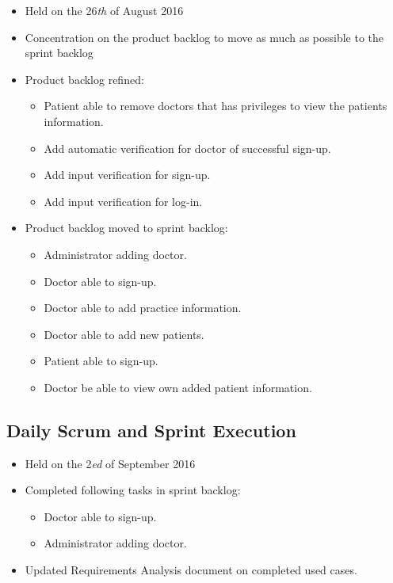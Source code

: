 \documentclass[a4paper]{article}
\begin{document}
\begin{itemize}
\item Held on the 26\textit{th} of August 2016
\item Concentration on the product backlog to move as much as possible to the sprint backlog
\item Product backlog refined:

\begin{itemize}
\item Patient able to remove doctors that has privileges to view the patients information.
\item Add automatic verification for doctor of successful sign-up.
\item Add input verification for sign-up.
\item Add input verification for log-in.
\end{itemize}

\item Product backlog moved to sprint backlog:

\begin{itemize}
\item Administrator adding doctor.
\item Doctor able to sign-up.
\item Doctor able to add practice information.
\item Doctor able to add new patients.
\item Patient able to sign-up.
\item Doctor be able to view own added patient information.
\end{itemize}

\end{itemize}

\subsection{Daily Scrum and Sprint Execution}

\begin{itemize}
\item Held on the 2\textit{ed} of September 2016
\item Completed following tasks in sprint backlog:

\begin{itemize}
\item Doctor able to sign-up.
\item Administrator adding doctor.
\end{itemize}

\item Updated Requirements Analysis document on completed used cases.

\end{itemize}
\end{document}
